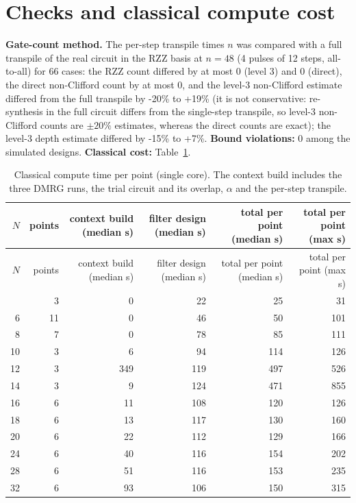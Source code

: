 \documentclass[11pt]{article}
\begin{document}
\section{Checks and classical compute cost}\label{sec:checks}
\textbf{Gate-count method.} The per-step transpile times $n$ was compared with a full transpile of the real circuit in the RZZ basis at $n=48$ (4 pulses of 12 steps, all-to-all) for 66 cases: the RZZ count differed by at most 0 (level 3) and 0 (direct), the direct non-Clifford count by at most 0, and the level-3 non-Clifford estimate differed from the full transpile by -20\% to +19\% (it is not conservative: re-synthesis in the full circuit differs from the single-step transpile, so level-3 non-Clifford counts are $\pm20\%$ estimates, whereas the direct counts are exact); the level-3 depth estimate differed by -15\% to +7\%. \textbf{Bound violations:} 0 among the simulated designs. \textbf{Classical cost:} Table~\ref{tab:time}.
{\small
\begin{longtable}{rrrrrr}
\caption{Classical compute time per point (single core). The context build includes the three DMRG runs, the trial circuit and its overlap, $\alpha$ and the per-step transpile.}\label{tab:time}\\
\toprule
$N$ & points & context build (median s) & filter design (median s) & total per point (median s) & total per point (max s) \\
\midrule
\endfirsthead
\toprule
$N$ & points & context build (median s) & filter design (median s) & total per point (median s) & total per point (max s) \\
\midrule
\endhead
\bottomrule
\endfoot
4 & 3 & 0 & 22 & 25 & 31 \\
6 & 11 & 0 & 46 & 50 & 101 \\
8 & 7 & 0 & 78 & 85 & 111 \\
10 & 3 & 6 & 94 & 114 & 126 \\
12 & 3 & 349 & 119 & 497 & 526 \\
14 & 3 & 9 & 124 & 471 & 855 \\
16 & 6 & 11 & 108 & 120 & 126 \\
18 & 6 & 13 & 117 & 130 & 160 \\
20 & 6 & 22 & 112 & 129 & 166 \\
24 & 6 & 40 & 116 & 154 & 202 \\
28 & 6 & 51 & 116 & 153 & 235 \\
32 & 6 & 93 & 106 & 150 & 315 \\
\end{longtable}
}
\end{document}
